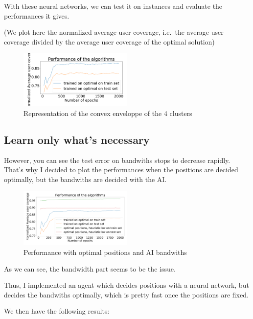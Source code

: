\documentclass[letterpaper]{article}
\begin{document}
\;

With these neural networks, we can test it on instances and evaluate the performances it gives.

(We plot here the normalized average user coverage, i.e.\, the average user coverage divided by the average user coverage of the optimal solution)


\begin{figure}[H]
    \centering
    \includegraphics[width=0.5\textwidth]{images/bilan_en _fonction epochs.png}
    \caption{Representation of the convex enveloppe of the 4 clusters}
\end{figure}

\subsection{Learn only what's necessary}

However, you can see the test error on bandwiths stops to decrease rapidly.
That's why I decided to plot the performances when the positions are decided optimally, but the bandwiths are decided with the AI.

\begin{figure}[H]
    \centering
    \includegraphics[width=0.5\textwidth]{images/bilan_en _fonction epochs_aibw.png}
    \caption{Performance with optimal positions and AI bandwiths}
\end{figure}

As we can see, the bandwidth part seems to be the issue.

Thus, I implemented an agent which decides positions with a neural network, but decides the bandwiths optimally,
which is pretty fast once the positions are fixed.

We then have the following results:
\end{document}
